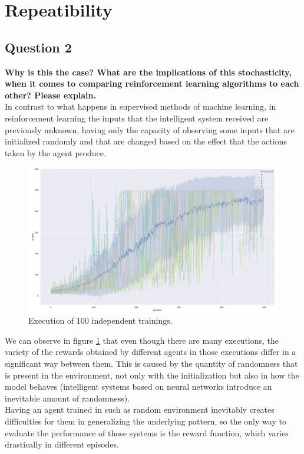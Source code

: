\documentclass[12pt]{article}
\begin{document}
\section{Repeatibility}
\label{sec:repeatibility}

\subsection{Question 2}
\label{sec:question-2}
\textbf {
    Why is this the case? What are the implications of this stochasticity, when it comes to comparing reinforcement learning algorithms to each other? Please explain.
}\\

In contrast to what happens in supervised methods of machine learning, in reinforcement learning the inputs that the intelligent system received are previously unknown, having only the capacity of observing some inputs that are initialized randomly and that are changed based on the effect that the actions taken by the agent produce. \\

\begin{figure}[H]
	\centering  
    \includegraphics[width=0.6\columnwidth]{img/training.pdf}
	\caption{Execution of 100 independent trainings.}
	\label{question-2:fig}
\end{figure}


We can observe in figure \ref{question-2:fig} that even though there are many executions, the variety of the rewards obtained by different agents in those executions differ in a significant way between them. This is caused by the quantity of randomness that is present in the environment, not only with the initialization but also in how the model behaves (intelligent systems based on neural networks introduce an inevitable amount of randomness).\\

Having an agent trained in such as random environment inevitably creates difficulties for them in generalizing the underlying pattern, so the only way to evaluate the performance of those systems is the reward function, which varies drastically in different episodes. \\
\end{document}
